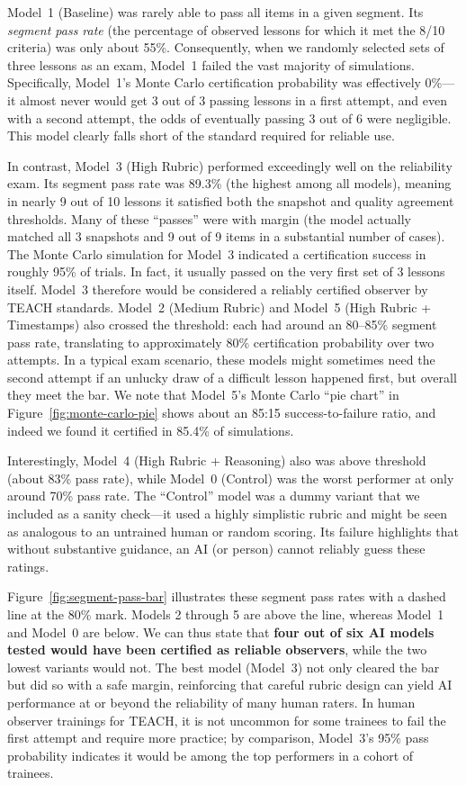 \documentclass[12pt]{article}
\begin{document}
Model~1 (Baseline) was rarely able to pass all items in a given segment. Its \textit{segment pass rate} (the percentage of observed lessons for which it met the 8/10 criteria) was only about 55\%. Consequently, when we randomly selected sets of three lessons as an exam, Model~1 failed the vast majority of simulations. Specifically, Model~1’s Monte Carlo certification probability was effectively 0\%—it almost never would get 3 out of 3 passing lessons in a first attempt, and even with a second attempt, the odds of eventually passing 3 out of 6 were negligible. This model clearly falls short of the standard required for reliable use.

In contrast, Model~3 (High Rubric) performed exceedingly well on the reliability exam. Its segment pass rate was 89.3\% (the highest among all models), meaning in nearly 9 out of 10 lessons it satisfied both the snapshot and quality agreement thresholds. Many of these “passes” were with margin (the model actually matched all 3 snapshots and 9 out of 9 items in a substantial number of cases). The Monte Carlo simulation for Model~3 indicated a certification success in roughly 95\% of trials. In fact, it usually passed on the very first set of 3 lessons itself. Model~3 therefore would be considered a reliably certified observer by TEACH standards. Model~2 (Medium Rubric) and Model~5 (High Rubric + Timestamps) also crossed the threshold: each had around an 80–85\% segment pass rate, translating to approximately 80\% certification probability over two attempts. In a typical exam scenario, these models might sometimes need the second attempt if an unlucky draw of a difficult lesson happened first, but overall they meet the bar. We note that Model~5’s Monte Carlo “pie chart” in Figure~\ref{fig:monte-carlo-pie} shows about an 85:15 success-to-failure ratio, and indeed we found it certified in 85.4\% of simulations.

Interestingly, Model~4 (High Rubric + Reasoning) also was above threshold (about 83\% pass rate), while Model~0 (Control) was the worst performer at only around 70\% pass rate. The “Control” model was a dummy variant that we included as a sanity check—it used a highly simplistic rubric and might be seen as analogous to an untrained human or random scoring. Its failure highlights that without substantive guidance, an AI (or person) cannot reliably guess these ratings.

Figure~\ref{fig:segment-pass-bar} illustrates these segment pass rates with a dashed line at the 80\% mark. Models 2 through 5 are above the line, whereas Model~1 and Model~0 are below. We can thus state that \textbf{four out of six AI models tested would have been certified as reliable observers}, while the two lowest variants would not. The best model (Model~3) not only cleared the bar but did so with a safe margin, reinforcing that careful rubric design can yield AI performance at or beyond the reliability of many human raters. In human observer trainings for TEACH, it is not uncommon for some trainees to fail the first attempt and require more practice; by comparison, Model~3’s 95\% pass probability indicates it would be among the top performers in a cohort of trainees.
\end{document}
